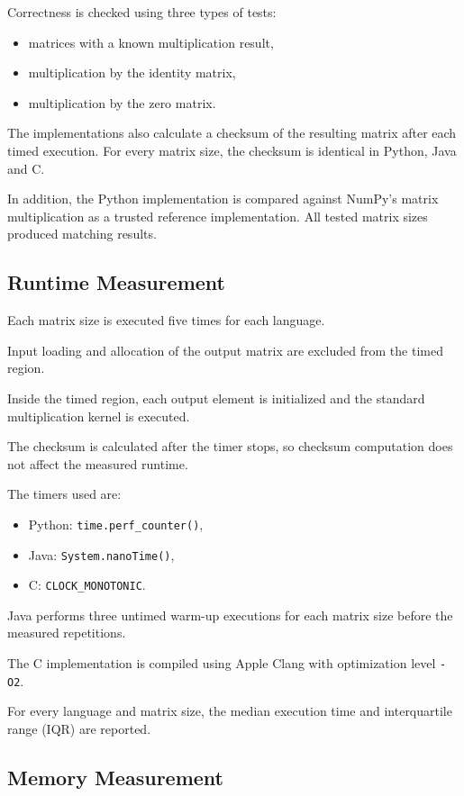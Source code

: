 \documentclass[11pt,a4paper]{article}
\begin{document}
Correctness is checked using three types of tests:

\begin{itemize}
    \item matrices with a known multiplication result,
    \item multiplication by the identity matrix,
    \item multiplication by the zero matrix.
\end{itemize}

The implementations also calculate a checksum of the resulting matrix after each timed execution. For every matrix size, the checksum is identical in Python, Java and C.

In addition, the Python implementation is compared against NumPy's matrix multiplication as a trusted reference implementation. All tested matrix sizes produced matching results.

\subsection{Runtime Measurement}

Each matrix size is executed five times for each language.

Input loading and allocation of the output matrix are excluded from the timed region.

Inside the timed region, each output element is initialized and the standard multiplication kernel is executed.

The checksum is calculated after the timer stops, so checksum computation does not affect the measured runtime.

The timers used are:

\begin{itemize}
    \item Python: \texttt{time.perf\_counter()},
    \item Java: \texttt{System.nanoTime()},
    \item C: \texttt{CLOCK\_MONOTONIC}.
\end{itemize}

Java performs three untimed warm-up executions for each matrix size before the measured repetitions.

The C implementation is compiled using Apple Clang with optimization level \texttt{-O2}.

For every language and matrix size, the median execution time and interquartile range (IQR) are reported.

\subsection{Memory Measurement}
\end{document}
